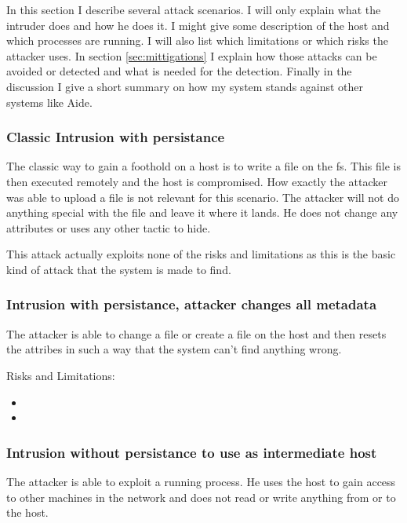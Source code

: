 In this section I describe several attack scenarios. I will only explain what the intruder does and how he does it. I might give some description of the host and which processes are running. I will also list which limitations or which risks the attacker uses. In section \ref{sec:mittigations} I explain how those attacks can be avoided or detected and what is needed for the detection. Finally in the discussion I give a short summary on how my system stands against other systems like Aide. 

\subsubsection{Classic Intrusion with persistance}
\label{sec:attack:classic}

The classic way to gain a foothold on a host is to write a file on the \gls{fs}. This file is then executed remotely and the host is compromised. How exactly the attacker was able to upload a file is not relevant for this scenario. The attacker will not do anything special with the file and leave it where it lands. He does not change any attributes or uses any other tactic to hide.

This attack actually exploits none of the risks and limitations as this is the basic kind of attack that the system is made to find. 

\subsubsection{Intrusion with persistance, attacker changes all metadata}
\label{sec:attack:changeattr}

The attacker is able to change a file or create a file on the host and then resets the attribes in such a way that the system can't find anything wrong.

Risks and Limitations:
\begin{itemize}
	\item {}
	\item {}
\end{itemize}

\subsubsection{Intrusion without persistance to use as intermediate host}
\label{sec:attack:nopersistanceintermediatehost}

The attacker is able to exploit a running process. He uses the host to gain access to other machines in the network and does not read or write anything from or to the host. 

